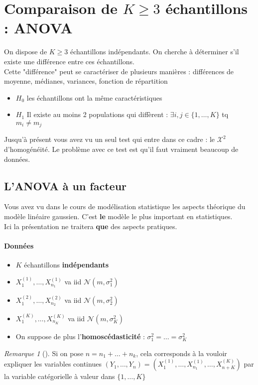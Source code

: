 \documentclass{article}
\theoremstyle{plain}%
\theoremstyle{definition}
\theoremstyle{remark}
\newtheorem*{rem}{Remarque}
\begin{document}
\section{Comparaison de $ K \geq 3 $ échantillons : ANOVA}
On dispose de $ K \geq 3 $ échantillons indépendants. On cherche à déterminer s'il existe une différence entre ces échantillons. \\
Cette "différence" peut se caractériser de plusieurs manières : différences de moyenne, médianes, variances, fonction de répartition
\begin{itemize}
    \item $ H_0 $ les échantillons ont la même caractéristiques
    \item $ H_1 $ Il existe au moins 2 populations qui diffèrent : $ \exists i,j \in \{1, \dots, K\} $ tq $ m_i \neq m_j $
\end{itemize}
Jusqu'à présent vous avez vu un seul test qui entre dans ce cadre : le $ \mathcal{X}^2 $ d'homogénéité. Le problème avec ce test est qu'il faut vraiment beaucoup de données.

\subsection{L'ANOVA à un facteur}
Vous avez vu dans le cours de modélisation statistique les aspects théorique du modèle linéaire gaussien. C'est \textbf{le} modèle le plus important en statistiques. \\
Ici la présentation ne traitera \textbf{que} des aspects pratiques. 

\paragraph*{Données} \begin{itemize}
    \item $ K $ échantillons \textbf{indépendants}
    \item $ X_1^{(1)}, \dots, X_{n_1}^{(1)} $ va iid $ \mathcal{N}(m, \sigma_{1} ^2) $ 
    \item $ X_1^{(2)}, \dots, X_{n_2}^{(2)} $ va iid $ \mathcal{N}(m, \sigma_{2} ^2) $ 
    \item $ X_1^{(K)}, \dots, X_{n_K}^{(K)} $ va iid $ \mathcal{N}(m, \sigma_{K} ^2) $
    \item On suppose de plus l'\textbf{homoscédasticité} : $ \sigma _1^2 = \dots = \sigma _K^2 $ 
\end{itemize}

\begin{rem}[]
    Si on pose $ n=n_1 + \dots + n_k $, cela corresponds à la vouloir expliquer les variables continues $ (Y_1, \dots, Y_n) = (X_1^{(1)}, \dots, X_{n_1}^{(1)}, \dots, X_{n+K}^{(K)})$ par la variable catégorielle à valeur dans $ \{1, \dots, K\} $ 
\end{rem}
\end{document}
